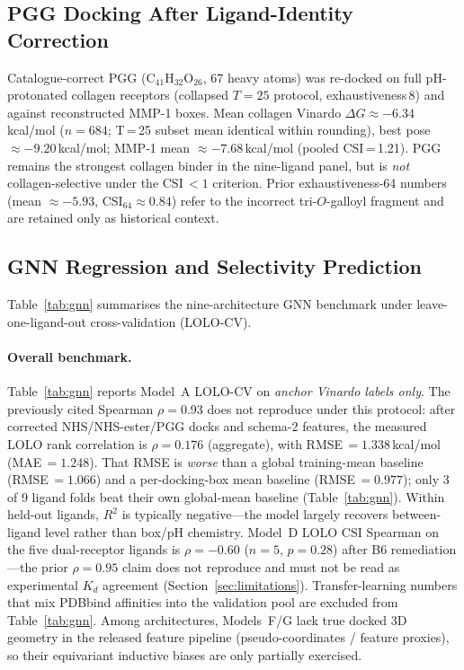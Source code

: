 \documentclass[11pt]{article}
\begin{document}
\subsection{PGG Docking After Ligand-Identity Correction}
\label{sec:pgg_sens}

Catalogue-correct PGG (C$_{41}$H$_{32}$O$_{26}$, 67 heavy atoms) was
re-docked on full pH-protonated collagen receptors (collapsed $T{=}25$
protocol, exhaustiveness\,8) and against reconstructed MMP-1 boxes.
Mean collagen Vinardo $\Delta G \approx -6.34$\,kcal/mol ($n{=}684$;
T\,=\,25 subset mean identical within rounding), best pose
$\approx -9.20$\,kcal/mol; MMP-1 mean $\approx -7.68$\,kcal/mol
(pooled CSI\,=\,1.21).
PGG remains the strongest collagen binder in the nine-ligand panel, but
is \emph{not} collagen-selective under the CSI\,$< 1$ criterion.
Prior exhaustiveness-64 numbers (mean $\approx -5.93$, CSI$_{64}\approx 0.84$)
refer to the incorrect tri-$O$-galloyl fragment and are retained only as
historical context.

\subsection{GNN Regression and Selectivity Prediction}
\label{sec:gnn_results}

Table~\ref{tab:gnn} summarises the nine-architecture GNN benchmark under
leave-one-ligand-out cross-validation (LOLO-CV).

\paragraph{Overall benchmark.}
Table~\ref{tab:gnn} reports Model~A LOLO-CV on \emph{anchor Vinardo labels
only}.
The previously cited Spearman $\rho = 0.93$ does not reproduce under this
protocol: after corrected NHS/NHS-ester/PGG docks and schema-2 features,
the measured LOLO rank correlation is
$\rho = 0.176$ (aggregate), with RMSE\,$= 1.338$\,kcal/mol
(MAE\,$= 1.248$).
That RMSE is \emph{worse} than a global training-mean baseline
(RMSE\,$= 1.066$) and a per-docking-box mean baseline
(RMSE\,$= 0.977$); only 3 of 9 ligand folds beat their own global-mean
baseline (Table~\ref{tab:gnn}).
Within held-out ligands, $R^{2}$ is typically negative---the model
largely recovers between-ligand level rather than box/pH chemistry.
Model~D LOLO CSI Spearman on the five dual-receptor ligands is
$\rho = -0.60$ ($n{=}5$, $p{=}0.28$) after B6 remediation---the prior
$\rho = 0.95$ claim does not reproduce and must not be read as
experimental $K_{d}$ agreement (Section~\ref{sec:limitations}).
Transfer-learning numbers that mix PDBbind affinities into the
validation pool are excluded from Table~\ref{tab:gnn}.
Among architectures, Models~F/G lack true docked 3D geometry in the
released feature pipeline (pseudo-coordinates / feature proxies), so
their equivariant inductive biases are only partially exercised.
\end{document}
